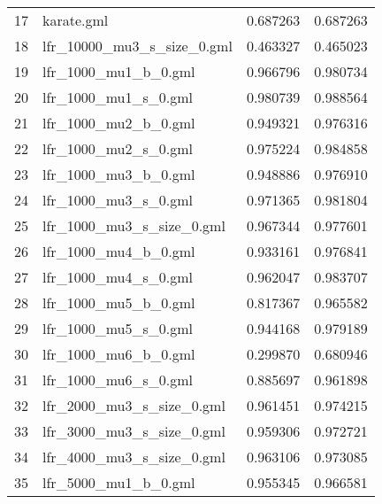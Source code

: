 \begin{tabular}{llrr}
17 &                  karate.gml &                      0.687263 &                    0.687263 \\
18 &  lfr\_10000\_mu3\_s\_size\_0.gml &                      0.463327 &                    0.465023 \\
19 &        lfr\_1000\_mu1\_b\_0.gml &                      0.966796 &                    0.980734 \\
20 &        lfr\_1000\_mu1\_s\_0.gml &                      0.980739 &                    0.988564 \\
21 &        lfr\_1000\_mu2\_b\_0.gml &                      0.949321 &                    0.976316 \\
22 &        lfr\_1000\_mu2\_s\_0.gml &                      0.975224 &                    0.984858 \\
23 &        lfr\_1000\_mu3\_b\_0.gml &                      0.948886 &                    0.976910 \\
24 &        lfr\_1000\_mu3\_s\_0.gml &                      0.971365 &                    0.981804 \\
25 &   lfr\_1000\_mu3\_s\_size\_0.gml &                      0.967344 &                    0.977601 \\
26 &        lfr\_1000\_mu4\_b\_0.gml &                      0.933161 &                    0.976841 \\
27 &        lfr\_1000\_mu4\_s\_0.gml &                      0.962047 &                    0.983707 \\
28 &        lfr\_1000\_mu5\_b\_0.gml &                      0.817367 &                    0.965582 \\
29 &        lfr\_1000\_mu5\_s\_0.gml &                      0.944168 &                    0.979189 \\
30 &        lfr\_1000\_mu6\_b\_0.gml &                      0.299870 &                    0.680946 \\
31 &        lfr\_1000\_mu6\_s\_0.gml &                      0.885697 &                    0.961898 \\
32 &   lfr\_2000\_mu3\_s\_size\_0.gml &                      0.961451 &                    0.974215 \\
33 &   lfr\_3000\_mu3\_s\_size\_0.gml &                      0.959306 &                    0.972721 \\
34 &   lfr\_4000\_mu3\_s\_size\_0.gml &                      0.963106 &                    0.973085 \\
35 &        lfr\_5000\_mu1\_b\_0.gml &                      0.955345 &                    0.966581 \\

\end{tabular}

